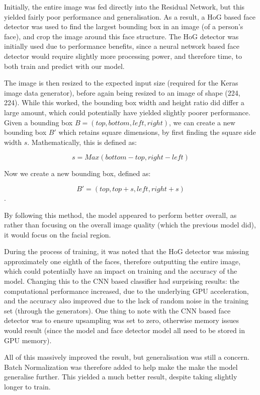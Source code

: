 \documentclass[10pt,a4paper]{article}
\begin{document}
        Initially, the entire image was fed directly into the Residual Network, but this yielded fairly poor performance and generalisation. As a result,
        a HoG based face detector was used to find the largest bounding box in an image (of a person's face), and crop the image around this face structure. The HoG detector was
        initially used due to performance benefits, since a neural network based face detector would require slightly more processing power, and therefore time, to both train and
        predict with our model.

        The image is then resized to the expected input size (required for the Keras image data generator), before again being resized to an image of shape (224, 224).
        While this worked, the bounding box width and height ratio did differ a large amount, which could potentially have yielded slightly poorer performance.
        Given a bounding box $B = (top, bottom, left, right)$, we can create a new bounding box $B'$ which retains square dimensions, by first finding the square
        side width $s$. Mathematically, this is defined as:

        $$s = Max(bottom - top, right - left)$$

        Now we create a new bounding box, defined as:

        $$B' = (top, top + s, left, right + s)$$.

        By following this method, the model appeared to perform better overall, as rather than focusing on the overall image quality (which the previous model did),
        it would focus on the facial region.

        During the process of training, it was noted that the HoG detector was missing approximately one eighth of the faces, therefore outputting the entire image, which
        could potentially have an impact on training and the accuracy of the model. Changing this to the CNN based classifier had surprising results: the computational performance increased,
        due to the underlying GPU acceleration, and the accuracy also improved due to the lack of random noise in the training set (through the generators). One thing to note with the CNN based
        face detector was to ensure upsampling was set to zero, otherwise memory issues would result (since the model and face detector model all need to be stored in GPU memory).
        
        All of this massively improved the result, but generalisation was still a concern. Batch Normalization was therefore added to help make the make the model generalise further.
        This yielded a much better result, despite taking slightly longer to train. 
\end{document}

